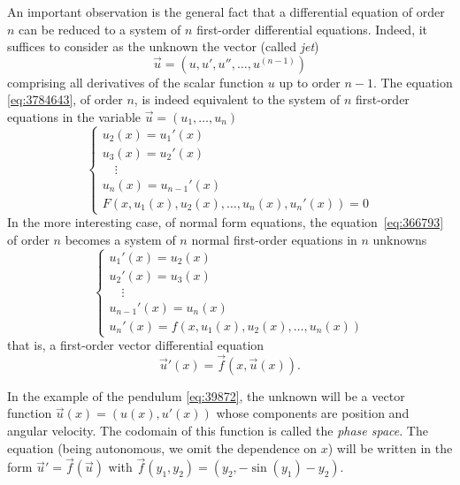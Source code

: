 An important observation is the general fact that a differential equation
of order $n$ can be reduced to a system of $n$ first-order differential
equations.
Indeed, it suffices to consider as the unknown the vector (called \emph{jet})
\[
  \vec u = (u, u', u'', \dots, u^{(n-1)})
\]
comprising all derivatives of the scalar function $u$ up to order $n-1$.
The equation \eqref{eq:3784643}, of order $n$, is indeed equivalent
to the system of $n$ first-order equations in the variable
$\vec u = (u_1, \dots, u_n)$
\[
  \begin{cases}
    u_2(x) = u_1'(x)\\
    u_3(x) = u_2'(x)\\
    \quad \vdots \\
    u_{n}(x) = u_{n-1}'(x)\\
    F(x, u_1(x), u_2(x), \dots, u_n(x), u_n'(x)) = 0
  \end{cases}
\]
In the more interesting case,
of normal form equations,
the equation~\eqref{eq:366793} of order $n$
becomes a system of $n$ normal first-order equations
in $n$ unknowns
\[
  \begin{cases}
  u_1'(x) = u_2(x)\\
  u_2'(x) = u_3(x)\\
  \quad \vdots\\
  u_{n-1}'(x) = u_n(x)\\
  u_n'(x) = f(x,u_1(x), u_2(x), \dots, u_n(x))
  \end{cases}
\]
that is, a first-order vector differential equation
\[
  \vec u'(x) = \vec f(x, \vec u(x)).
\]

In the example of the pendulum \eqref{eq:39872}, the unknown will be a vector
function
$\vec u(x) = (u(x),u'(x))$ whose components are position and angular velocity.
The codomain of this function is called the \emph{phase space}.
The equation (being autonomous, we omit the dependence on $x$)
will be written in the form $\vec u' = \vec f(\vec u)$ with
$\vec f(y_1,y_2) = (y_2, -\sin(y_1) - y_2)$.

